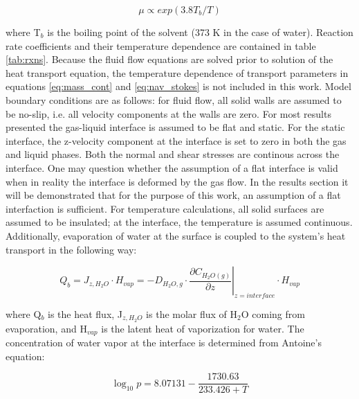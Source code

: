 \begin{equation}
	\mu \propto exp(3.8T_b/T)
	\label{eq:viscosityTempDependence}
\end{equation}

where T$_b$ is the boiling point of the solvent (373 K in the case of water). Reaction rate coefficients and their temperature dependence are contained in table \ref{tab:rxns}. Because the fluid flow equations are solved prior to solution of the heat transport equation, the temperature dependence of transport parameters in equations \ref{eq:mass_cont} and \ref{eq:nav_stokes} is not included in this work. Model boundary conditions are as follows: for fluid flow, all solid walls are assumed to be no-slip, i.e. all velocity components at the walls are zero. For most results presented the gas-liquid interface is assumed to be flat and static. For the static interface, the z-velocity component at the interface is set to zero in both the gas and liquid phases. Both the normal and shear stresses are continous across the interface. One may question whether the assumption of a flat interface is valid when in reality the interface is deformed by the gas flow. In the results section it will be demonstrated that for the purpose of this work, an assumption of a flat interfaction is sufficient. For temperature calculations, all solid surfaces are assumed to be insulated; at the interface, the temperature is assumed continuous. Additionally, evaporation of water at the surface is coupled to the system's heat transport in the following way: \cite{bird2007transport}

\begin{equation}
    Q_b = J_{z,H_2O}\cdot H_{vap} = -D_{H_2O,g}\cdot \left.\frac{\partial C_{H_2O(g)}}{\partial z}\right|_{z=interface}\cdot H_{vap}
    \label{eq:vapheatsrc}
\end{equation}

where Q$_b$ is the heat flux, J$_{z,H_2O}$ is the molar flux of H$_2$O coming from evaporation, and H$_{vap}$ is the latent heat of vaporization for water. The concentration of water vapor at the interface is determined from Antoine's equation: \cite{antoine1888thermodynamic}

\begin{equation}
    \log_{10}p = 8.07131 - \frac{1730.63}{233.426+T}
    \label{eq:Antoine}
\end{equation}

